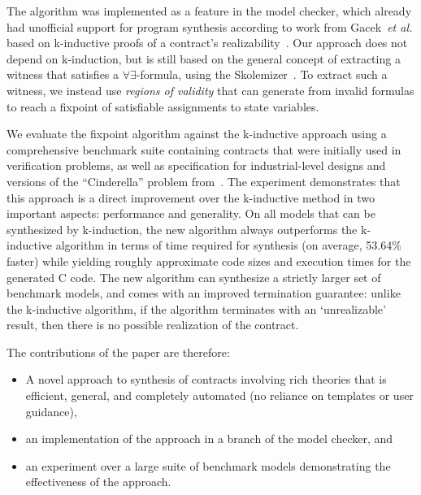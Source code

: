 The algorithm was implemented as a feature in the \jkind model checker, which
already had unofficial support for program synthesis according to work from
Gacek~\textit{et al.} based on k-inductive proofs of a contract's
realizability~\cite{gacek2015towards,katis2016towards,KatisFGBGW16}.
Our approach does not depend on k-induction, but is still based on the general
concept of extracting a witness that satisfies a $\forall\exists$-formula, using
the \aeval Skolemizer~\cite{fedyukovich2015automated,KatisFGBGW16}. To extract such a witness, we
instead use \textit{regions of validity} that \aeval can generate from invalid formulas to reach a fixpoint of satisfiable assignments to state variables.

We evaluate the fixpoint algorithm against the k-inductive approach using a comprehensive benchmark suite containing contracts that were initially used in verification problems, as well as specification for industrial-level designs and versions of the ``Cinderella'' problem from~\cite{beyene2014constraint}.  The experiment demonstrates that this approach is a direct improvement over the k-inductive method in two important aspects: performance and generality.  On all models that can be synthesized by k-induction, the new algorithm always outperforms the k-inductive algorithm in terms of time required for synthesis (on average, 53.64\% faster) while yielding roughly approximate code sizes and execution times for the generated C code.  The new algorithm can synthesize a strictly larger set of benchmark models, and comes with an improved termination guarantee: unlike the k-inductive algorithm, if the algorithm terminates with an `unrealizable' result, then there is no possible realization of the contract.

The contributions of the paper are therefore:
\begin{itemize}
    \item A novel approach to synthesis of contracts involving rich theories that is efficient, general, and completely automated (no reliance on templates or user guidance),
    \item an implementation of the approach in a branch of the \jkind model checker, and
    \item an experiment over a large suite of benchmark models demonstrating the effectiveness of the approach.
\end{itemize}

